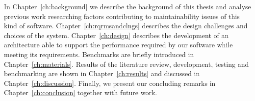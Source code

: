 In Chapter~\ref{ch:background} we describe the background of this thesis and analyse previous work researching factors contributing to maintainability issues of this kind of software. Chapter~\ref{ch:rqrmsandclngs} describes the design challenges and choices of the system. Chapter~\ref{ch:design} describes the development of an architecture able to support the performance required by our software while meeting its requirements. Benchmarks are briefly introduced in Chapter~\ref{ch:materials}. Results of the literature review, development, testing and benchmarking are shown in Chapter~\ref{ch:results} and discussed in Chapter~\ref{ch:discussion}. Finally, we present our concluding remarks in Chapter~\ref{ch:conclusion} together with future work.

